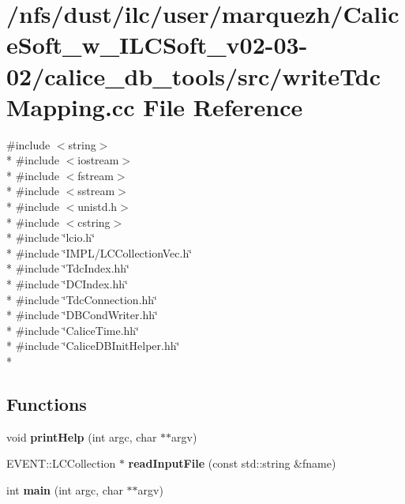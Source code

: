 \section{/nfs/dust/ilc/user/marquezh/\-Calice\-Soft\-\_\-w\-\_\-\-I\-L\-C\-Soft\-\_\-v02-\/03-\/02/calice\-\_\-db\-\_\-tools/src/write\-Tdc\-Mapping.cc File Reference}
\label{writeTdcMapping_8cc}
{\ttfamily \#include $<$string$>$}\\*
{\ttfamily \#include $<$iostream$>$}\\*
{\ttfamily \#include $<$fstream$>$}\\*
{\ttfamily \#include $<$sstream$>$}\\*
{\ttfamily \#include $<$unistd.\-h$>$}\\*
{\ttfamily \#include $<$cstring$>$}\\*
{\ttfamily \#include \char`\"{}lcio.\-h\char`\"{}}\\*
{\ttfamily \#include \char`\"{}I\-M\-P\-L/\-L\-C\-Collection\-Vec.\-h\char`\"{}}\\*
{\ttfamily \#include \char`\"{}Tdc\-Index.\-hh\char`\"{}}\\*
{\ttfamily \#include \char`\"{}D\-C\-Index.\-hh\char`\"{}}\\*
{\ttfamily \#include \char`\"{}Tdc\-Connection.\-hh\char`\"{}}\\*
{\ttfamily \#include \char`\"{}D\-B\-Cond\-Writer.\-hh\char`\"{}}\\*
{\ttfamily \#include \char`\"{}Calice\-Time.\-hh\char`\"{}}\\*
{\ttfamily \#include \char`\"{}Calice\-D\-B\-Init\-Helper.\-hh\char`\"{}}\\*
\subsection*{Functions}
\begin{DoxyCompactItemize}
\item 
void {\bfseries print\-Help} (int argc, char $\ast$$\ast$argv)\label{writeTdcMapping_8cc_a1b5a1d3071ab7a7222af534a20a6aba6}

\item 
E\-V\-E\-N\-T\-::\-L\-C\-Collection $\ast$ {\bfseries read\-Input\-File} (const std\-::string \&fname)\label{writeTdcMapping_8cc_a73c9acbe18b12bd0312a40ddea8da9d4}

\item 
int {\bfseries main} (int argc, char $\ast$$\ast$argv)\label{writeTdcMapping_8cc_a3c04138a5bfe5d72780bb7e82a18e627}

\end{DoxyCompactItemize}


